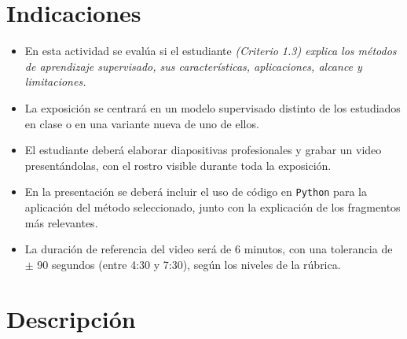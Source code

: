 \documentclass[a4,11pt]{aleph-notas}
\begin{document}
\encabezado

\section{Indicaciones}

\begin{itemize}[leftmargin=*]
\item 
    En esta actividad se evalúa si el estudiante \textit{(Criterio 1.3) explica los métodos de aprendizaje supervisado, sus características, aplicaciones, alcance y limitaciones.}
\item
    La exposición se centrará en un modelo supervisado distinto de los estudiados en clase o en una variante nueva de uno de ellos.
\item 
    El estudiante deberá elaborar diapositivas profesionales y grabar un video presentándolas, con el rostro visible durante toda la exposición.
\item 
    En la presentación se deberá incluir el uso de código en \texttt{Python} para la aplicación del método seleccionado, junto con la explicación de los fragmentos más relevantes.
\item 
    La duración de referencia del video será de 6 minutos, con una tolerancia de $\pm$ 90 segundos (entre 4:30 y 7:30), según los niveles de la rúbrica.
\end{itemize}

\section{Descripción}
\end{document}
